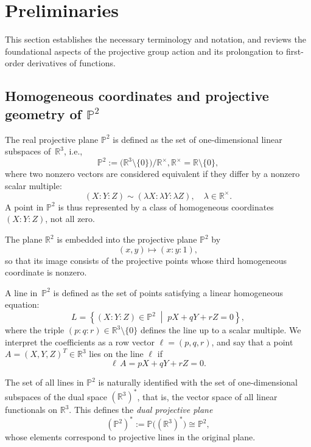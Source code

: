 \documentclass[12pt,reqno]{amsart}
\begin{document}

\section{Preliminaries}


This section establishes the necessary terminology and notation, and reviews the foundational aspects of the projective group action and its  prolongation to first-order derivatives of functions.


\subsection{Homogeneous coordinates and projective geometry of $\mathbb{P}^2$}


The real projective plane $\mathbb{P}^2$ is defined as the set of one-dimensional linear subspaces of~$\mathbb{R}^3$, i.e.,
\[
\mathbb{P}^2 := \bigl(\mathbb{R}^3 \setminus \{0\} \bigr) / \mathbb{R}^\times,  \mathbb{R}^\times= \mathbb{R} \setminus \{ 0\}, 
\]
where two nonzero vectors are considered equivalent if they differ by a nonzero scalar multiple:
\[
(X:Y:Z) \sim (\lambda X:\lambda Y:\lambda Z), \quad \lambda \in \mathbb{R}^\times.
\]
A point in $\mathbb{P}^2$ is thus represented by a class of homogeneous coordinates $(X:Y:Z)$, not all zero.


The plane $\mathbb{R}^2$ is embedded into the projective plane $\mathbb{P}^2$ by
\[
(x,y) \longmapsto (x:y:1),
\]
so that its image consists of the projective points whose third homogeneous coordinate is nonzero.%


 A  line in~$\mathbb{P}^2$ is defined as the set of points satisfying a linear homogeneous equation:
\[
L = \left\{(X:Y:Z) \in \mathbb{P}^2 \;\middle|\; pX + qY + rZ = 0 \right\},
\]
where the triple $(p:q:r) \in \mathbb{R}^3 \setminus \{0\}$ defines the line up to a scalar multiple. 
We interpret the coefficients as a row vector \( \ell = (p, q, r) \), and say that a point \( A = (X, Y, Z)^T \in \mathbb{R}^3 \) lies on the line \( \ell \) if
\[
\ell \, A = pX + qY + rZ = 0.
\]




 The set of all lines in $\mathbb{P}^2$ is naturally identified with the set of one-dimensional subspaces of  the dual space $(\mathbb{R}^3)^*$, that is,   the vector space of all linear functionals on $\mathbb{R}^3$. This defines the \emph{dual projective plane}
\[
(\mathbb{P}^2)^* := \mathbb{P}\bigl((\mathbb{R}^3)^*\bigr) \cong \mathbb{P}^2,
\]
whose elements correspond to projective lines in the original plane.
\end{document}
